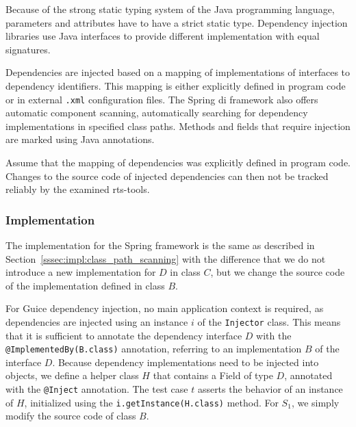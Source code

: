 
Because of the strong static typing system of the Java programming language,
parameters and attributes have to have a strict static type. Dependency injection libraries use Java
interfaces to provide different implementation with equal signatures.

Dependencies are injected based on a mapping of implementations of interfaces to dependency
identifiers. This mapping is either explicitly defined in program code or in external \texttt{.xml}
configuration files. The Spring \ac{di} framework also offers automatic component scanning,
automatically searching for dependency implementations in specified class paths. Methods and fields
that require injection are marked using Java annotations.

\begin{hypothesis}\label{hyp:dep_inj:source}
    Assume that the mapping of dependencies was explicitly defined in program code.
    Changes to the source code of injected dependencies can then not be tracked reliably by the
    examined \ac{rts}-tools.
\end{hypothesis}

\subsubsection{Implementation }
The implementation for the Spring framework is the same as described in
Section~\ref{sssec:impl:class_path_scanning} with the difference that we do not introduce a new
implementation for $D$ in class $C$, but we change the source code of the implementation defined in
class $B$.

For Guice dependency injection, no main application context is required, as dependencies are
injected using an instance $i$ of the \texttt{Injector} class. This means that it is sufficient to annotate
the dependency interface $D$ with the \texttt{@ImplementedBy(B.class)} annotation, referring to
an implementation $B$ of the interface $D$. Because
dependency implementations need to be injected into objects, we define a helper class $H$ that
contains a Field of type $D$, annotated with the \texttt{@Inject} annotation. The test case $t$
asserts the behavior of an instance of $H$, initialized using the \texttt{i.getInstance(H.class)}
method. For $S_1$, we simply modify the source code of class $B$.

